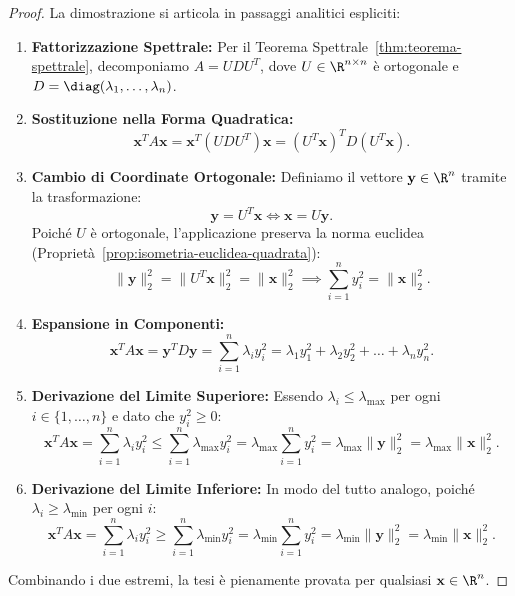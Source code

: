 \begin{proof}
La dimostrazione si articola in passaggi analitici espliciti:
\begin{enumerate}
    \item \textbf{Fattorizzazione Spettrale:} Per il Teorema Spettrale~\ref{thm:teorema-spettrale}, decomponiamo $A = U D U^T$, dove $U \in \R^{n \times n}$ \`e ortogonale e $D = \diag(\lambda_1, \dots, \lambda_n)$.
    \item \textbf{Sostituzione nella Forma Quadratica:}
    \begin{equation}
        \mathbf{x}^T A \mathbf{x} = \mathbf{x}^T (U D U^T) \mathbf{x} = (U^T \mathbf{x})^T D (U^T \mathbf{x}).
    \end{equation}
    \item \textbf{Cambio di Coordinate Ortogonale:} Definiamo il vettore $\mathbf{y} \in \R^n$ tramite la trasformazione:
    \begin{equation}
        \mathbf{y} = U^T \mathbf{x} \iff \mathbf{x} = U \mathbf{y}.
    \end{equation}
    Poich\'e $U$ \`e ortogonale, l'applicazione preserva la norma euclidea (Propriet\`a~\ref{prop:isometria-euclidea-quadrata}):
    \begin{equation}
        \|\mathbf{y}\|_2^2 = \|U^T \mathbf{x}\|_2^2 = \|\mathbf{x}\|_2^2 \implies \sum_{i=1}^n y_i^2 = \|\mathbf{x}\|_2^2.
    \end{equation}
    \item \textbf{Espansione in Componenti:}
    \begin{equation}
        \mathbf{x}^T A \mathbf{x} = \mathbf{y}^T D \mathbf{y} = \sum_{i=1}^n \lambda_i y_i^2 = \lambda_1 y_1^2 + \lambda_2 y_2^2 + \dots + \lambda_n y_n^2.
    \end{equation}
    \item \textbf{Derivazione del Limite Superiore:}
    Essendo $\lambda_i \le \lambda_{\max}$ per ogni $i \in \{1, \dots, n\}$ e dato che $y_i^2 \ge 0$:
    \begin{equation}
        \mathbf{x}^T A \mathbf{x} = \sum_{i=1}^n \lambda_i y_i^2 \le \sum_{i=1}^n \lambda_{\max} y_i^2 = \lambda_{\max} \sum_{i=1}^n y_i^2 = \lambda_{\max} \|\mathbf{y}\|_2^2 = \lambda_{\max} \|\mathbf{x}\|_2^2.
    \end{equation}
    \item \textbf{Derivazione del Limite Inferiore:}
    In modo del tutto analogo, poich\'e $\lambda_i \ge \lambda_{\min}$ per ogni $i$:
    \begin{equation}
        \mathbf{x}^T A \mathbf{x} = \sum_{i=1}^n \lambda_i y_i^2 \ge \sum_{i=1}^n \lambda_{\min} y_i^2 = \lambda_{\min} \sum_{i=1}^n y_i^2 = \lambda_{\min} \|\mathbf{y}\|_2^2 = \lambda_{\min} \|\mathbf{x}\|_2^2.
    \end{equation}
\end{enumerate}
Combinando i due estremi, la tesi \`e pienamente provata per qualsiasi $\mathbf{x} \in \R^n$.
\end{proof}

